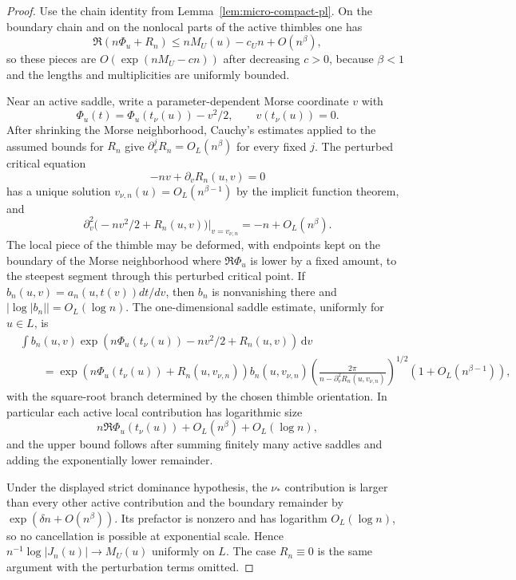 \documentclass[reqno]{article}
\theoremstyle{definition}
\theoremstyle{remark}
\theoremstyle{plain}
\newcommand{\dd}{\,\mathrm d}
\begin{document}
\begin{proof}
Use the chain identity from Lemma~\ref{lem:micro-compact-pl}. On the boundary chain and on the nonlocal parts of the active thimbles one has
\[
\Re(n\Phi_u+R_n)\le nM_U(u)-c_Un+O(n^\beta),
\]
so these pieces are $O(\exp(nM_U-c n))$ after decreasing $c>0$, because $\beta<1$ and the lengths and multiplicities are uniformly bounded.

Near an active saddle, write a parameter-dependent Morse coordinate $v$ with
\[
\Phi_u(t)=\Phi_u(t_\nu(u))-v^2/2,
\qquad v(t_\nu(u))=0.
\]
After shrinking the Morse neighborhood, Cauchy's estimates applied to the assumed bounds for $R_n$ give $\partial_v^jR_n=O_L(n^\beta)$ for every fixed $j$. The perturbed critical equation
\[
-nv+\partial_vR_n(u,v)=0
\]
has a unique solution $v_{\nu,n}(u)=O_L(n^{\beta-1})$ by the implicit function theorem, and
\[
\partial_v^2\bigl(-nv^2/2+R_n(u,v)\bigr)\big|_{v=v_{\nu,n}}
=-n+O_L(n^\beta).
\]
The local piece of the thimble may be deformed, with endpoints kept on the boundary of the Morse neighborhood where $\Re\Phi_u$ is lower by a fixed amount, to the steepest segment through this perturbed critical point. If $b_n(u,v)=a_n(u,t(v))dt/dv$, then $b_n$ is nonvanishing there and $\bigl|\log|b_n|\bigr|=O_L(\log n)$. The one-dimensional saddle estimate, uniformly for $u\in L$, is
\[
\begin{aligned}
&\int b_n(u,v)
\exp\left(n\Phi_u(t_\nu(u))-nv^2/2+R_n(u,v)\right)\dd v \\
&\qquad=
\exp\left(n\Phi_u(t_\nu(u))+R_n(u,v_{\nu,n})\right)
 b_n(u,v_{\nu,n})
\left(\frac{2\pi}{n-\partial_v^2R_n(u,v_{\nu,n})}\right)^{1/2}
\left(1+O_L(n^{\beta-1})\right),
\end{aligned}
\]
with the square-root branch determined by the chosen thimble orientation. In particular each active local contribution has logarithmic size
\[
n\Re\Phi_u(t_\nu(u))+O_L(n^\beta)+O_L(\log n),
\]
and the upper bound follows after summing finitely many active saddles and adding the exponentially lower remainder.

Under the displayed strict dominance hypothesis, the $\nu_\ast$ contribution is larger than every other active contribution and the boundary remainder by $\exp(\delta n+O(n^\beta))$. Its prefactor is nonzero and has logarithm $O_L(\log n)$, so no cancellation is possible at exponential scale. Hence $n^{-1}\log|J_n(u)|\to M_U(u)$ uniformly on $L$. The case $R_n\equiv0$ is the same argument with the perturbation terms omitted.
\end{proof}
\end{document}

